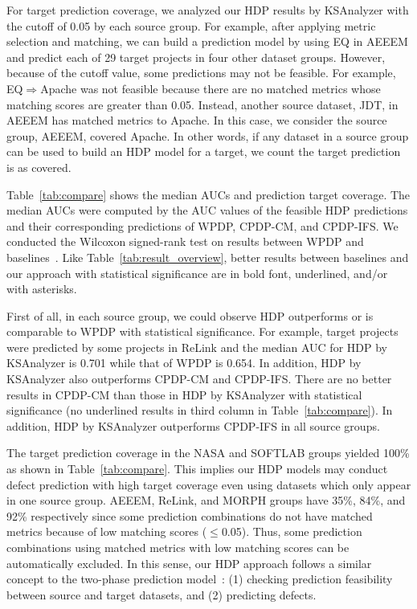 \begin{table}[t]
\begin{tabular}{|c|@{ }c@{ }|@{ }c@{ }|@{ }c@{ }|@{ }c@{ }||c|}


\end{tabular}
\end{table}
For target prediction coverage, we analyzed our HDP results by KSAnalyzer with
the cutoff of 0.05 by each source group. For example, after applying
metric selection and matching, we can build a prediction model by using EQ in
AEEEM and predict each of 29 target projects in four other dataset
groups. However, because of the cutoff value, some predictions may not be
feasible. For example, EQ$\Rightarrow$Apache was not feasible because there are
no matched metrics whose matching scores are greater than 0.05.
Instead, another source dataset, JDT, in AEEEM has
matched metrics to Apache. In this case, we consider
the source group, AEEEM, covered Apache. In other words, if
any dataset in a source group can be used to build an HDP model for a target, we
count the target prediction is as covered.

Table~\ref{tab:compare} shows the median AUCs and
prediction target coverage. The median AUCs were computed by the AUC
values of the feasible HDP predictions and their corresponding predictions of
WPDP, CPDP-CM, and CPDP-IFS. We conducted the Wilcoxon
signed-rank test on results between WPDP and baselines~\cite{Wilcoxon45}. Like
Table~\ref{tab:result_overview}, better results between baselines and our
approach with statistical significance are in bold font, underlined, and/or with
asterisks.%

First of all, in each source group, we could observe HDP outperforms or is
comparable to WPDP with statistical significance.
For example, target projects were predicted by some projects in ReLink and
the median AUC for HDP by KSAnalyzer is 0.701 while that of
WPDP is 0.654. In addition,
HDP by KSAnalyzer also
outperforms CPDP-CM and CPDP-IFS.
There are no better results in CPDP-CM
than those in HDP by KSAnalyzer with statistical significance (no
underlined results in third column in Table~\ref{tab:compare}). In addition, HDP
by KSAnalyzer outperforms CPDP-IFS in all source groups.

The target prediction coverage in the NASA and SOFTLAB groups yielded 100\% as
shown in Table~\ref{tab:compare}. This implies our HDP models may conduct defect
prediction with high target coverage even using datasets which only appear in
one source group. AEEEM, ReLink, and MORPH groups have 35\%, 84\%, and 92\% respectively
since some prediction combinations do not have matched metrics because of low matching scores ($\leq$0.05).
Thus, some prediction combinations
using matched metrics with low matching scores can be automatically excluded. In
this sense, our HDP approach follows a similar concept to the two-phase
prediction model~\cite{Kim13}: (1) checking prediction feasibility between
source and target datasets, and (2) predicting defects.


